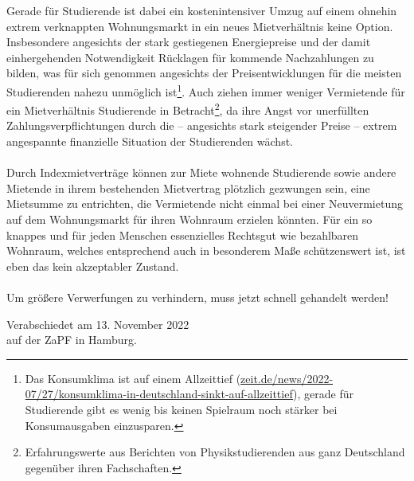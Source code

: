 \documentclass[DIV=calc]{scrartcl}
\begin{document}
Gerade für Studierende ist dabei ein kostenintensiver Umzug auf einem ohnehin extrem verknappten Wohnungsmarkt in ein neues Mietverhältnis keine Option. Insbesondere angesichts der stark gestiegenen Energiepreise und der damit einhergehenden Notwendigkeit Rücklagen für kommende Nachzahlungen zu bilden, was für sich genommen angesichts der Preisentwicklungen für die meisten Studierenden nahezu unmöglich ist\footnote{Das Konsumklima ist auf einem Allzeittief (\href{https://www.zeit.de/news/2022-07/27/konsumklima-in-deutschland-sinkt-auf-allzeittief}{zeit.de/news/2022-07/27/konsumklima-in-deutschland-sinkt-auf-allzeittief}), gerade für Studierende gibt es wenig bis keinen Spielraum noch stärker bei Konsumausgaben einzusparen.}. Auch ziehen immer weniger Vermietende für ein Mietverhältnis Studierende in Betracht\footnote{Erfahrungswerte aus Berichten von Physikstudierenden aus ganz Deutschland gegenüber ihren Fachschaften.}, da ihre Angst vor unerfüllten Zahlungsverpflichtungen durch die -- angesichts stark steigender Preise -- extrem angespannte finanzielle Situation der Studierenden wächst.\\\\
Durch Indexmietverträge können zur Miete wohnende Studierende sowie andere Mietende in ihrem bestehenden Mietvertrag plötzlich gezwungen sein, eine Mietsumme zu entrichten, die Vermietende nicht einmal bei einer Neuvermietung auf dem Wohnungsmarkt für ihren Wohnraum erzielen könnten. Für ein so knappes und für jeden Menschen essenzielles Rechtsgut wie bezahlbaren Wohnraum, welches entsprechend auch in besonderem Maße schützenswert ist, ist eben das kein akzeptabler Zustand.\\\\
Um größere Verwerfungen zu verhindern, muss jetzt schnell gehandelt werden!

    
\vspace{1cm} 

\vfill
\begin{flushright}
	Verabschiedet am 13. November 2022 \\
	auf der ZaPF in Hamburg.
\end{flushright}
\end{document}
